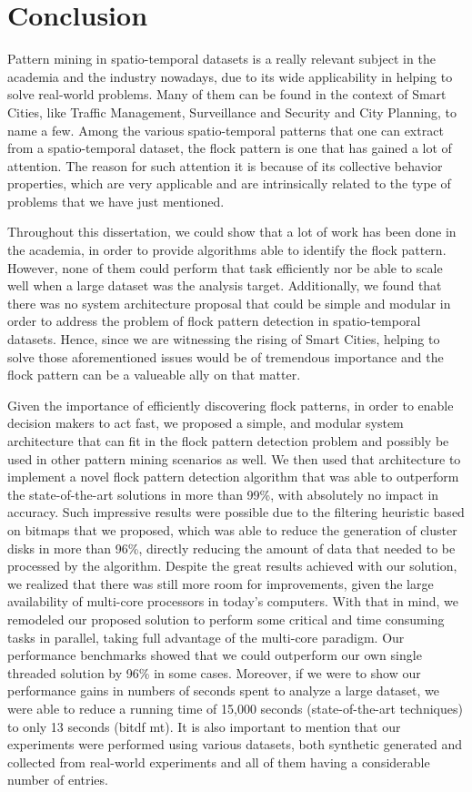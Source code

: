 \chapter{Conclusion}
\label{chp:conclusion}
Pattern mining in spatio-temporal datasets is a really relevant subject in the academia and the industry nowadays, due
to its wide applicability in helping to solve real-world problems. Many of them can be found in the context of Smart
Cities, like Traffic Management, Surveillance and Security and City Planning, to name a few. Among the various
spatio-temporal patterns that one can extract from a spatio-temporal dataset, the flock pattern is one that has gained a
lot of attention. The reason for such attention it is because of its collective behavior properties, which are very
applicable and are intrinsically related to the type of problems that we have just mentioned.

Throughout this dissertation, we could show that a lot of work has been done in the academia, in order to provide
algorithms able to identify the flock pattern. However, none of them could perform that task efficiently nor be able to
scale well when a large dataset was the analysis target. Additionally, we found that there was no system architecture
proposal that could be simple and modular in order to address the problem of flock pattern detection in spatio-temporal
datasets. Hence, since we are witnessing the rising of Smart Cities, helping to solve those aforementioned issues would
be of tremendous importance and the flock pattern can be a valueable ally on that matter.

Given the importance of efficiently discovering flock patterns, in order to enable decision makers to act fast, we
proposed a simple, and modular system architecture that can fit in the flock pattern detection problem and possibly be
used in other pattern mining scenarios as well. We then used that architecture to implement a novel flock pattern
detection algorithm that was able to outperform the state-of-the-art solutions in more than 99\%, with absolutely no
impact in accuracy. Such impressive results were possible due to the filtering heuristic based on bitmaps that we
proposed, which was able to reduce the generation of cluster disks in more than 96\%, directly reducing the amount of
data that needed to be processed by the algorithm. Despite the great results achieved with our solution, we realized
that there was still more room for improvements, given the large availability of multi-core processors in today's
computers. With that in mind, we remodeled our proposed solution to perform some critical and time consuming tasks in
parallel, taking full advantage of the multi-core paradigm. Our performance benchmarks showed that we could outperform
our own single threaded solution by 96\% in some cases. Moreover, if we were to show our performance gains in numbers of
seconds spent to analyze a large dataset, we were able to reduce a running time of 15,000 seconds (state-of-the-art
techniques) to only 13 seconds (\ac{bitdf} \ac{mt}). It is also important to mention that our experiments were performed
using various datasets, both synthetic generated and collected from real-world experiments and all of them having a
considerable number of entries.

